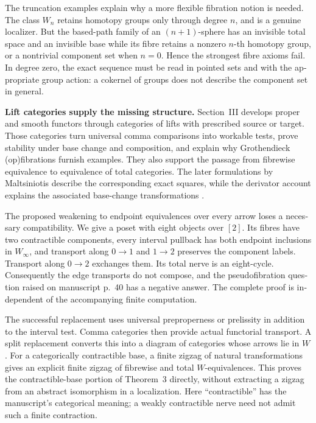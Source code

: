 \begin{otherlanguage}{english}
The truncation examples explain why a more flexible fibration notion is needed. The class \(W_n\) retains homotopy groups only through degree \(n\), and is a genuine localizer. But the based-path family of an \((n+1)\)-sphere has an invisible total space and an invisible base while its fibre retains a nonzero \(n\)-th homotopy group, or a nontrivial component set when \(n=0\). Hence the strongest fibre axioms fail. In degree zero, the exact sequence must be read in pointed sets and with the appropriate group action: a cokernel of groups does not describe the component set in general.

\medskip
\noindent\textbf{Lift categories supply the missing structure.}
Section~III develops proper and smooth functors through categories of lifts with prescribed source or target. Those categories turn universal comma comparisons into workable tests, prove stability under base change and composition, and explain why Grothendieck (op)fibrations furnish examples. They also support the passage from fibrewise equivalence to equivalence of total categories. The later formulations by Maltsiniotis describe the corresponding exact squares, while the derivator account explains the associated base-change transformations \citep{Maltsiniotis2005Asphericite,Maltsiniotis2012Exact,Groth2013}.

The proposed weakening to endpoint equivalences over every arrow loses a necessary compatibility. We give a poset with eight objects over \([2]\). Its fibres have two contractible components, every interval pullback has both endpoint inclusions in \(W_\infty\), and transport along \(0\to1\) and \(1\to2\) preserves the component labels. Transport along \(0\to2\) exchanges them. Its total nerve is an eight-cycle. Consequently the edge transports do not compose, and the pseudofibration question raised on manuscript p.~40 has a negative answer. The complete proof is independent of the accompanying finite computation.

The successful replacement uses universal preproperness or prelissity in addition to the interval test. Comma categories then provide actual functorial transport. A split replacement converts this into a diagram of categories whose arrows lie in \(W\). For a categorically contractible base, a finite zigzag of natural transformations gives an explicit finite zigzag of fibrewise and total \(W\)-equivalences. This proves the contractible-base portion of Theorem~3 directly, without extracting a zigzag from an abstract isomorphism in a localization. Here “contractible” has the manuscript's categorical meaning; a weakly contractible nerve need not admit such a finite contraction.


\end{otherlanguage}
